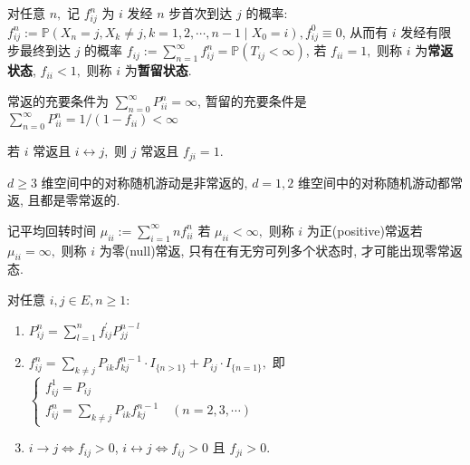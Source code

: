 \documentclass[10pt]{yerbaformat}
\begin{document}
\begin{definition}
    对任意 $n,$ 记 $f_{i j}^{n}$ 为 $i$ 发经 $n$ 步首次到达 $j$ 的概率: $f_{i j}^{n}:=\mathbb{P}\left(X_{n}=j, X_{k} \neq j, k=1,2, \cdots, n-1 \mid X_{0}=i\right), f_{i j}^{0} \equiv 0 $, 从而有 $i$ 发经有限步最终到达 $j$ 的概率 $f_{i j}:=\sum_{n=1}^{\infty} f_{i j}^{n}=\mathbb{P}\left(T_{i j}<\infty\right)$, 若 $f_{i i}=1,$ 则称 $i$ 为\textbf{常返状态}, $f_{i i}<1,$ 则称 $i$ 为\textbf{暂留状态}.
\end{definition}

\begin{definition}[判定定理]
    常返的充要条件为 $\sum_{n=0}^{\infty} P_{i i}^{n}=\infty$, 暂留的充要条件是 $\sum_{n=0}^{\infty} P_{i i}^{n}=1 /\left(1-f_{i i}\right)<\infty$
\end{definition}

\begin{corollary}
    若 $i$ 常返且 $i \leftrightarrow j,$ 则 $j$ 常返且 $f_{j i}=1 .$
\end{corollary}

\begin{theorem}[Polya 定理]
    $d \geq 3$ 维空间中的对称随机游动是非常返的, $d=1,2$ 维空间中的对称随机游动都常返, 且都是零常返的.
\end{theorem}

\begin{definition}[正常返与零常返]
    记平均回转时间 $\mu_{i i}:=\sum_{i=1}^{\infty} n f_{i i}^{n}$ 若 $\mu_{i i}<\infty,$ 则称 $i$ 为正(positive)常返若 $\mu_{i i}=\infty,$ 则称 $i$ 为零(null)常返, 只有在有无穷可列多个状态时, 才可能出现零常返态.
\end{definition}

\begin{theorem}
    对任意 $i, j \in E, n \geq 1$:
    \begin{enumerate}
        \item $P_{i j}^{n}=\sum_{l=1}^{n} f_{i j}^{\prime} P_{j j}^{n-l}$
        \item $f_{i j}^{n}=\sum_{k \neq j} P_{i k} f_{k j}^{n-1} \cdot I_{\{n>1\}}+P_{i j} \cdot I_{\{n=1\}},$ 即 $\left\{\begin{array}{l}f_{i j}^{1}=P_{i j} \\ f_{i j}^{n}=\sum_{k \neq j} P_{i k} f_{k j}^{n-1} \quad(n=2,3, \cdots)\end{array}\right.$
        \item $i \rightarrow j \Leftrightarrow f_{i j}>0$,
              $i \leftrightarrow j \Leftrightarrow f_{i j}>0$ 且 $f_{j i}>0 .$
    \end{enumerate}
\end{theorem}
\end{document}
